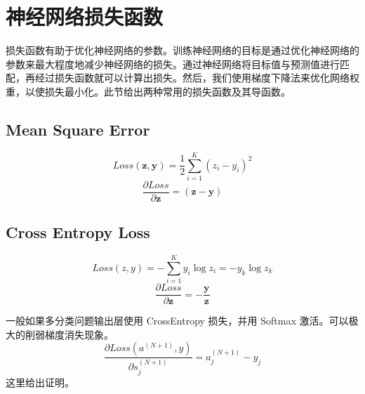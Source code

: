 \documentclass[UTF-8]{progbookcn}
\begin{document}
\section{神经网络损失函数}
损失函数有助于优化神经网络的参数。训练神经网络的目标是通过优化神经网络的参数来最大程度地减少神经网络的损失。通过神经网络将目标值与预测值进行匹配，再经过损失函数就可以计算出损失。然后，我们使用梯度下降法来优化网络权重，以使损失最小化\cite{DBLP:books/daglib/0040158}。此节给出两种常用的损失函数及其导函数。
\subsection{Mean Square Error}
\begin{equation}\label{2.2.1.1}
  Loss(\bm{z},\bm{y}) =\frac{1}{2} \sum_{i=1}^{K}(z_i-y_i)^2
\end{equation}
\begin{equation}\label{2.2.1.2}
\frac{\partial Loss}{\partial \bm{z}}  = (\bm{z}-\bm{y})
\end{equation}
\subsection{Cross Entropy Loss\cite{DBLP:journals/corr/abs-1905-10626}}
\begin{equation}\label{2.2.1.3}
  Loss(z,y) = -\sum_{i=1}^{K}y_i\log z_i=-y_k\log z_k
\end{equation}
\begin{equation}\label{2.2.1.4}
  \frac{\partial Loss}{\partial \bm{z}} =-\frac{\bm{y}}{\bm{z}}
\end{equation}
\begin{keypoint}
  一般如果多分类问题输出层使用 CrossEntropy 损失，并用 Softmax 激活。可以极大的削弱梯度消失现象。
  \begin{equation}\label{E:Softmax+CE}
    \frac{\partial Loss(a^{(N+1)}, y)}{\partial s^{(N+1)}_j} = a^{(N+1)}_j -y_j
  \end{equation}
  这里给出证明。
\end{keypoint}
\end{document}
